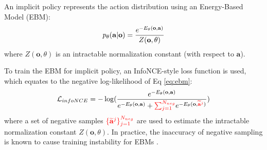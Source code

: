 An implicit policy represents the action distribution using an Energy-Based Model (EBM):
\vspace{-2mm}
\begin{equation}
    \label{eq:ebm}
    p_\theta(\mathbf{a}|\mathbf{o})=\frac{e^{-E_\theta(\mathbf{o},\mathbf{a})}}{Z(\mathbf{o},\theta)}
\vspace{-1mm}
\end{equation}
where $Z(\mathbf{o},\theta)$ is an intractable normalization constant (with respect to $\mathbf{a}$).

To train the EBM for implicit policy, an InfoNCE-style loss function is used, which equates to the negative log-likelihood of Eq \ref{eq:ebm}:
\begin{equation}
    \label{eq:infonce}
    \mathcal{L}_{infoNCE}=-\log(\frac{
        e^{-E_\theta(\mathbf{o},\mathbf{a})}
    }{
        e^{-E_\theta(\mathbf{o},\mathbf{a})} +
            \textcolor{red}{\sum^{N_{neg}}_{j=1}}e^{
                -E_\theta(\mathbf{o},\textcolor{red}{\widetilde{\mathbf{a}}^j})}
    })
\end{equation}
where a set of negative samples $\textcolor{red}{\{\widetilde{\mathbf{a}}^j\}^{N_{neg}}_{j=1}}$ are used to estimate the intractable normalization constant $Z(\mathbf{o},\theta)$. In practice, the inaccuracy of negative sampling is known to cause training instability for EBMs \cite{du2020improved,ta2022conditional}.

